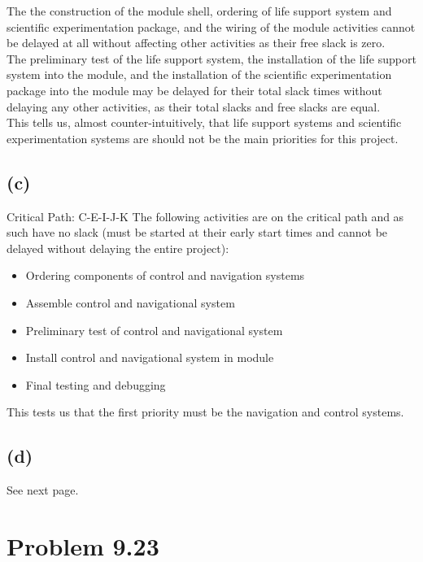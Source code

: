 \documentclass{article}
\begin{document}
	The the construction of the module shell, ordering of life support system and scientific experimentation package, and the wiring of the module activities cannot be delayed at all without affecting other activities as their free slack is zero.\\
	The preliminary test of the life support system, the installation of the life support system into the module, and the installation of the scientific experimentation package into the module may be delayed for their total slack times without delaying any other activities, as their total slacks and free slacks are equal.\\
	This tells us, almost counter-intuitively, that life support systems and scientific experimentation systems are should not be the main priorities for this project.
	
	\subsection*{(c)}
	\noindent Critical Path: C-E-I-J-K\newline
	The following activities are on the critical path and as such have no slack (must be started at their early start times and cannot be delayed without delaying the entire project):
	\begin{itemize}
		\item Ordering components of control and navigation systems\\
		\item Assemble control and navigational system\\
		\item Preliminary test of control and navigational system\\
		\item Install control and navigational system in module\\
		\item Final testing and debugging\\
	\end{itemize}
	\noindent This tests us that the first priority must be the navigation and control systems.
	

	
	\subsection*{(d)}
	\noindent See next page.
	\begin{landscape}
	\scalebox{.75}{
		}
	\end{landscape}
	\section*{Problem 9.23}
\end{document}
